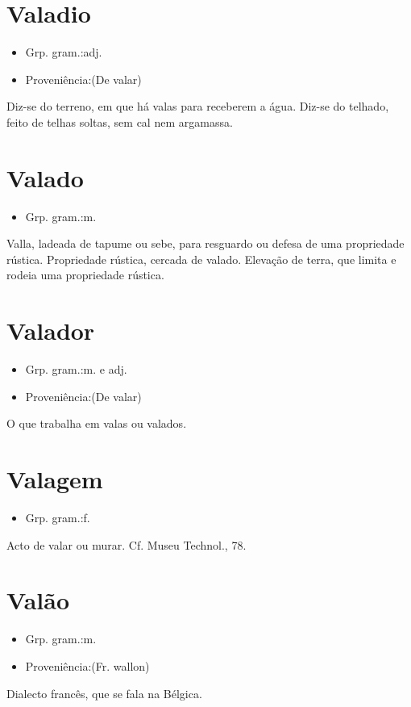 \documentclass{article}
\begin{document}
\section{Valadio}
\begin{itemize}
\item {Grp. gram.:adj.}
\end{itemize}
\begin{itemize}
\item {Proveniência:(De \textunderscore valar\textunderscore )}
\end{itemize}
Diz-se do terreno, em que há valas para receberem a água.
Diz-se do telhado, feito de telhas soltas, sem cal nem argamassa.
\section{Valado}
\begin{itemize}
\item {Grp. gram.:m.}
\end{itemize}
Valla, ladeada de tapume ou sebe, para resguardo ou defesa de uma propriedade rústica.
Propriedade rústica, cercada de valado.
Elevação de terra, que limita e rodeia uma propriedade rústica.
\section{Valador}
\begin{itemize}
\item {Grp. gram.:m.  e  adj.}
\end{itemize}
\begin{itemize}
\item {Proveniência:(De \textunderscore valar\textunderscore )}
\end{itemize}
O que trabalha em valas ou valados.
\section{Valagem}
\begin{itemize}
\item {Grp. gram.:f.}
\end{itemize}
Acto de valar ou murar. Cf. \textunderscore Museu Technol.\textunderscore , 78.
\section{Valão}
\begin{itemize}
\item {Grp. gram.:m.}
\end{itemize}
\begin{itemize}
\item {Proveniência:(Fr. \textunderscore wallon\textunderscore )}
\end{itemize}
Dialecto francês, que se fala na Bélgica.
\end{document}

